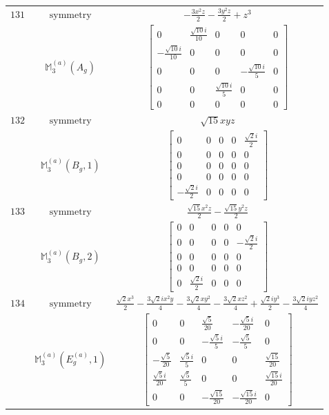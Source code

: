\documentclass[fleqn,8pt,landscape]{jsarticle}
\begin{document}
\begin{longtable}{ccc}
$ 131 $ & $ \text{symmetry} $ & $ - \frac{3 x^{2} z}{2} - \frac{3 y^{2} z}{2} + z^{3} $ \\
$  $ & $ \mathbb{M}_{3}^{(a)}(A_{g}) $ & $ \begin{bmatrix} 0 & \frac{\sqrt{10} i}{10} & 0 & 0 & 0 \\ - \frac{\sqrt{10} i}{10} & 0 & 0 & 0 & 0 \\ 0 & 0 & 0 & - \frac{\sqrt{10} i}{5} & 0 \\ 0 & 0 & \frac{\sqrt{10} i}{5} & 0 & 0 \\ 0 & 0 & 0 & 0 & 0 \end{bmatrix} $ \\ \hline
$ 132 $ & $ \text{symmetry} $ & $ \sqrt{15} x y z $ \\
$  $ & $ \mathbb{M}_{3}^{(a)}(B_{g},1) $ & $ \begin{bmatrix} 0 & 0 & 0 & 0 & \frac{\sqrt{2} i}{2} \\ 0 & 0 & 0 & 0 & 0 \\ 0 & 0 & 0 & 0 & 0 \\ 0 & 0 & 0 & 0 & 0 \\ - \frac{\sqrt{2} i}{2} & 0 & 0 & 0 & 0 \end{bmatrix} $ \\ \hline
$ 133 $ & $ \text{symmetry} $ & $ \frac{\sqrt{15} x^{2} z}{2} - \frac{\sqrt{15} y^{2} z}{2} $ \\
$  $ & $ \mathbb{M}_{3}^{(a)}(B_{g},2) $ & $ \begin{bmatrix} 0 & 0 & 0 & 0 & 0 \\ 0 & 0 & 0 & 0 & - \frac{\sqrt{2} i}{2} \\ 0 & 0 & 0 & 0 & 0 \\ 0 & 0 & 0 & 0 & 0 \\ 0 & \frac{\sqrt{2} i}{2} & 0 & 0 & 0 \end{bmatrix} $ \\ \hline
$ 134 $ & $ \text{symmetry} $ & $ \frac{\sqrt{2} x^{3}}{2} - \frac{3 \sqrt{2} i x^{2} y}{4} - \frac{3 \sqrt{2} x y^{2}}{4} - \frac{3 \sqrt{2} x z^{2}}{4} + \frac{\sqrt{2} i y^{3}}{2} - \frac{3 \sqrt{2} i y z^{2}}{4} $ \\
$  $ & $ \mathbb{M}_{3}^{(a)}(E_{g}^{(a)},1) $ & $ \begin{bmatrix} 0 & 0 & \frac{\sqrt{5}}{20} & - \frac{\sqrt{5} i}{20} & 0 \\ 0 & 0 & - \frac{\sqrt{5} i}{5} & - \frac{\sqrt{5}}{5} & 0 \\ - \frac{\sqrt{5}}{20} & \frac{\sqrt{5} i}{5} & 0 & 0 & \frac{\sqrt{15}}{20} \\ \frac{\sqrt{5} i}{20} & \frac{\sqrt{5}}{5} & 0 & 0 & \frac{\sqrt{15} i}{20} \\ 0 & 0 & - \frac{\sqrt{15}}{20} & - \frac{\sqrt{15} i}{20} & 0 \end{bmatrix} $ \\ \hline

\end{longtable}
\end{document}
